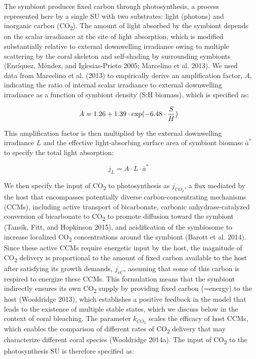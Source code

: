 \documentclass[]{elsarticle} %
\begin{document}
The symbiont produces fixed carbon through photosynthesis, a process
represented here by a single SU with two substrates: light (photons) and
inorganic carbon (CO\textsubscript{2}). The amount of light absorbed by
the symbiont depends on the scalar irradiance at the site of light
absorption, which is modified substantially relative to external
downwelling irradiance owing to multiple scattering by the coral
skeleton and self-shading by surrounding symbionts (Enríquez, Méndez,
and Iglesias-Prieto 2005; Marcelino et al. 2013). We used data from
Marcelino et al. (2013) to empirically derive an amplification factor,
\(A\), indicating the ratio of internal scalar irradiance to external
downwelling irradiance as a function of symbiont density (S:H biomass),
which is specified as:

\begin{equation} A = 1.26 + 1.39 \cdot \exp(-6.48 \cdot {S \over H}) \end{equation}

This amplification factor is then multiplied by the external downwelling
irradiance \(L\) and the effective light-absorbing surface area of
symbiont biomass \(\bar{a}^*\) to specify the total light absorption:

\begin{equation} j_L =  A \cdot L \cdot \bar{a}^* \end{equation}

We then specify the input of CO\textsubscript{2} to photosynthesis as
\(j_{CO_2}\), a flux mediated by the host that encompasses potentially
diverse carbon-concentrating mechanisms (CCMs), including active
transport of bicarbonate, carbonic anhydrase-catalyzed conversion of
bicarbonate to CO\textsubscript{2} to promote diffusion toward the
symbiont (Tansik, Fitt, and Hopkinson 2015), and acidification of the
symbiosome to increase localized CO\textsubscript{2} concentrations
around the symbiont (Barott et al. 2014). Since these active CCMs
require energetic input by the host, the magnitude of
CO\textsubscript{2} delivery is proportional to the amount of fixed
carbon available to the host after satisfying its growth demands,
\(j_{eC}\), assuming that some of this carbon is respired to energize
these CCMs. This formulation means that the symbiont indirectly ensures
its own CO\textsubscript{2} supply by providing fixed carbon (=energy)
to the host (Wooldridge 2013), which establishes a positive feedback in
the model that leads to the existence of multiple stable states, which
we discuss below in the context of coral bleaching. The parameter
\(k_{CO_2}\) scales the efficacy of host CCMs, which enables the
comparison of different rates of CO\textsubscript{2} delivery that may
characterize different coral species (Wooldridge 2014a). The input of
CO\textsubscript{2} to the photosynthesis SU is therefore specified as:
\end{document}
